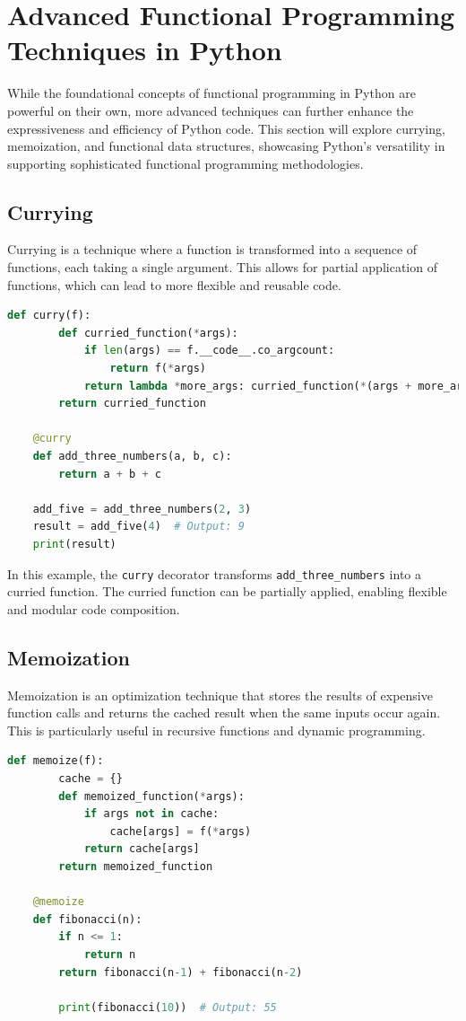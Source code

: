 \documentclass[a4paper]{article}
\begin{document}
\newpage
\section{Advanced Functional Programming Techniques in Python}
While the foundational concepts of functional programming in Python are powerful on their own, more advanced techniques can further enhance the expressiveness and efficiency of Python code. This section will explore currying, memoization, and functional data structures, showcasing Python's versatility in supporting sophisticated functional programming methodologies.

\subsection{Currying}
Currying is a technique where a function is transformed into a sequence of functions, each taking a single argument. This allows for partial application of functions, which can lead to more flexible and reusable code.

\begin{lstlisting}[language=Python, caption=Currying Example]
    def curry(f):
        def curried_function(*args):
            if len(args) == f.__code__.co_argcount:
                return f(*args)
            return lambda *more_args: curried_function(*(args + more_args))
        return curried_function

    @curry
    def add_three_numbers(a, b, c):
        return a + b + c

    add_five = add_three_numbers(2, 3)
    result = add_five(4)  # Output: 9
    print(result)
\end{lstlisting}

In this example, the \texttt{curry} decorator transforms \texttt{add\_three\_numbers} into a curried function. The curried function can be partially applied, enabling flexible and modular code composition.

\subsection{Memoization}
Memoization is an optimization technique that stores the results of expensive function calls and returns the cached result when the same inputs occur again. This is particularly useful in recursive functions and dynamic programming.

\begin{lstlisting}[language=Python, caption=Memoization Example]
    def memoize(f):
        cache = {}
        def memoized_function(*args):
            if args not in cache:
                cache[args] = f(*args)
            return cache[args]
        return memoized_function

    @memoize
    def fibonacci(n):
        if n <= 1:
            return n
        return fibonacci(n-1) + fibonacci(n-2)

        print(fibonacci(10))  # Output: 55
\end{lstlisting}
\end{document}
